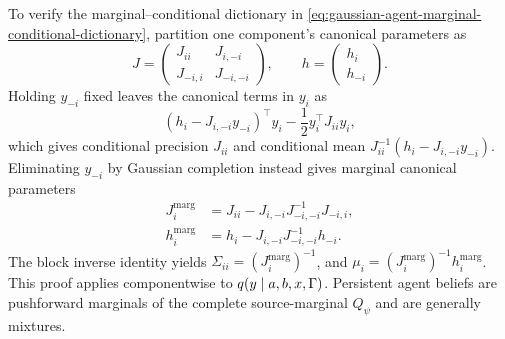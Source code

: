 To verify the marginal--conditional dictionary in \cref{eq:gaussian-agent-marginal-conditional-dictionary}, partition one component's canonical parameters as
\begin{equation}
J=
\begin{pmatrix}
J_{ii}&J_{i,-i}\\
J_{-i,i}&J_{-i,-i}
\end{pmatrix},
\qquad
h=
\begin{pmatrix}h_i\\h_{-i}\end{pmatrix}.
\label{eq:partitioned-agent-information-parameters}
\end{equation}
Holding $y_{-i}$ fixed leaves the canonical terms in $y_i$ as
\begin{equation}
\left(h_i-J_{i,-i}y_{-i}\right)^\top y_i
-\frac12y_i^\top J_{ii}y_i,
\label{eq:agent-conditional-canonical-exponent}
\end{equation}
which gives conditional precision $J_{ii}$ and conditional mean $J_{ii}^{-1}(h_i-J_{i,-i}y_{-i})$. Eliminating $y_{-i}$ by Gaussian completion instead gives marginal canonical parameters
\begin{equation}
\begin{aligned}
J_i^{\mathrm{marg}}
&=J_{ii}-J_{i,-i}J_{-i,-i}^{-1}J_{-i,i},\\
h_i^{\mathrm{marg}}
&=h_i-J_{i,-i}J_{-i,-i}^{-1}h_{-i}.
\end{aligned}
\label{eq:agent-marginal-schur-parameters}
\end{equation}
The block inverse identity yields $\Sigma_{ii}=(J_i^{\mathrm{marg}})^{-1}$, and $\mu_i=(J_i^{\mathrm{marg}})^{-1}h_i^{\mathrm{marg}}$. This proof applies componentwise to $q(y\mid a,b,x,\Gamma)$. Persistent agent beliefs are pushforward marginals of the complete source-marginal $Q_\psi$ and are generally mixtures.

